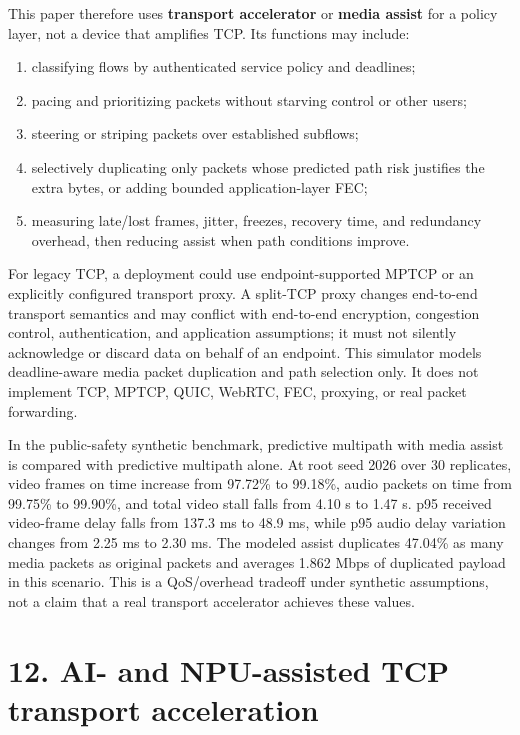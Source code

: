 \documentclass[
  american,
  11pt,
]{article}
\providecommand{\tightlist}{%
  \setlength{\itemsep}{0pt}\setlength{\parskip}{0pt}}
\begin{document}
This paper therefore uses \textbf{transport accelerator} or
\textbf{media assist} for a policy layer, not a device that amplifies
TCP. Its functions may include:

\begin{enumerate}
\def\labelenumi{\arabic{enumi}.}
\tightlist
\item
  classifying flows by authenticated service policy and deadlines;
\item
  pacing and prioritizing packets without starving control or other
  users;
\item
  steering or striping packets over established subflows;
\item
  selectively duplicating only packets whose predicted path risk
  justifies the extra bytes, or adding bounded application-layer FEC;
\item
  measuring late/lost frames, jitter, freezes, recovery time, and
  redundancy overhead, then reducing assist when path conditions
  improve.
\end{enumerate}

For legacy TCP, a deployment could use endpoint-supported MPTCP or an
explicitly configured transport proxy. A split-TCP proxy changes
end-to-end transport semantics and may conflict with end-to-end
encryption, congestion control, authentication, and application
assumptions; it must not silently acknowledge or discard data on behalf
of an endpoint. This simulator models deadline-aware media packet
duplication and path selection only. It does not implement TCP, MPTCP,
QUIC, WebRTC, FEC, proxying, or real packet forwarding.

In the public-safety synthetic benchmark, predictive multipath with
media assist is compared with predictive multipath alone. At root seed
2026 over 30 replicates, video frames on time increase from 97.72\% to
99.18\%, audio packets on time from 99.75\% to 99.90\%, and total video
stall falls from 4.10 s to 1.47 s. p95 received video-frame delay falls
from 137.3 ms to 48.9 ms, while p95 audio delay variation changes from
2.25 ms to 2.30 ms. The modeled assist duplicates 47.04\% as many media
packets as original packets and averages 1.862 Mbps of duplicated
payload in this scenario. This is a QoS/overhead tradeoff under
synthetic assumptions, not a claim that a real transport accelerator
achieves these values.

\section{12. AI- and NPU-assisted TCP transport
acceleration}\label{ai--and-npu-assisted-tcp-transport-acceleration}
\end{document}
